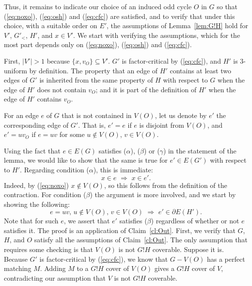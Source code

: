 \documentclass{article}
\theoremstyle{definition}
\begin{document}
Thus, it remains to indicate our choice of an induced odd cycle $O$ in $G$ so that (\ref{eq:noxo}), (\ref{eq:osh}) and (\ref{eq:cfc}) are satisfied, and to verify that under this choice, with a suitable order on $E'$, the assumptions of Lemma~\ref{lem:G!H} hold for $V'$, $G'_<$, $H'$, and $x \in V'$. We start with verifying the assumptions, which for the most part depends only on (\ref{eq:noxo}), (\ref{eq:osh}) and (\ref{eq:cfc}).

First, $|V'| > 1$ because $\{x, v_O\} \subseteq V'$. $G'$ is factor-critical by (\ref{eq:cfc}), and $H'$ is $3$-uniform by definition. The property that an edge of $H'$ contains at least two edges of $G'$ is inherited from the same property of $H$ with respect to $G$ when the edge of $H'$ does not contain $v_O$; and it is part of the definition of $H'$ when the edge of $H'$ contains $v_O$.

For an edge $e$ of $G$ that is not contained in $V(O)$, let us denote by $e'$ the corresponding edge of $G'$. That is, $e' = e$ if $e$ is disjoint from $V(O)$, and $e' = uv_O$ if $e = uv$ for some $u \notin V(O)$, $v \in V(O)$.

Using the fact that $e \in E(G)$ satisfies ($\alpha$), ($\beta$) or ($\gamma$) in the statement of the lemma, we would like to show that the same is true for $e' \in E(G')$ with respect to $H'$. Regarding condition ($\alpha$), this is immediate:
\begin{equation} \label{eq:con1}
x \in e \,\,\Longrightarrow\,\, x \in e'.
\end{equation}
Indeed, by (\ref{eq:noxo}) $x \notin V(O)$, so this follows from the definition of the contraction. For condition ($\beta$) the argument is more involved, and we start by showing the following:
\begin{equation} \label{eq:shad}
e = uv,\, u \notin V(O),\, v \in V(O)\,\,\Longrightarrow\,\, e' \in \partial E(H').
\end{equation}
Note that for such $e$, we assert that $e'$ satisfies ($\beta$) regardless of whether or not $e$ satisfies it. The proof is an application of Claim~\ref{cl:Out}. First, we verify that $G$, $H$, and $O$ satisfy all the assumptions of Claim~\ref{cl:Out}. The only assumption that requires some checking is that $V(O)$ is not $G!H$ coverable. Suppose it is. Because $G'$ is factor-critical by (\ref{eq:cfc}), we know that $G - V(O)$ has a perfect matching $M$. Adding $M$ to a $G!H$ cover of $V(O)$ gives a $G!H$ cover of $V$, contradicting our assumption that $V$ is not $G!H$ coverable.
\end{document}
